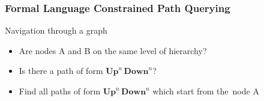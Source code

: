 \documentclass[xcolor=table,aspectratio=169]{beamer}
\begin{document}
\begin{frame}[fragile] \frametitle{Formal Language Constrained Path Querying}
      \begin{minipage}[m]{0.45\linewidth}
  \end{minipage}\hfill
  \begin{minipage}[m]{0.5\linewidth}
  Navigation through a graph
  \begin{itemize}
        \item Are nodes A and B on the same level of hierarchy?
        \item Is there a path of form $\textbf{Up}^n \, \textbf{Down}^n$?
        \item Find all paths of form $\textbf{Up}^n \, \textbf{Down}^n$ which start from the~node A
  \end{itemize}

  \end{minipage}

  \end{frame}
\end{document}
